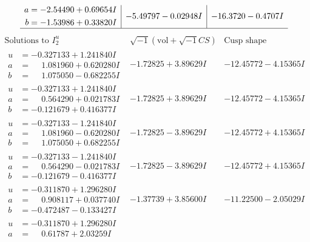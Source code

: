 \documentclass[1p]{elsarticle_modified}
\theoremstyle{definition}
\newcommand{\I}{\sqrt{-1}}
\begin{document}
$$\begin{array}{c|c|c}
\begin{aligned}
a &= -2.54490 + 0.69654 I \\
b &= -1.53986 + 0.33820 I\end{aligned}
 & -5.49797 - 0.02948 I & -16.3720 - 0.4707 I\\
 \hline 
 \end{array}$$\newpage$$\begin{array}{c|c|c}  
\text{Solutions to }I^u_{2}& \I (\text{vol} + \sqrt{-1}CS) & \text{Cusp shape}\\
 \hline 
\begin{aligned}
u &= -0.327133 + 1.241840 I \\
a &= \phantom{-}1.081960 + 0.620280 I \\
b &= \phantom{-}1.075050 - 0.682255 I\end{aligned}
 & -1.72825 + 3.89629 I & -12.45772 - 4.15365 I \\ \hline\begin{aligned}
u &= -0.327133 + 1.241840 I \\
a &= \phantom{-}0.564290 + 0.021783 I \\
b &= -0.121679 + 0.416377 I\end{aligned}
 & -1.72825 + 3.89629 I & -12.45772 - 4.15365 I \\ \hline\begin{aligned}
u &= -0.327133 - 1.241840 I \\
a &= \phantom{-}1.081960 - 0.620280 I \\
b &= \phantom{-}1.075050 + 0.682255 I\end{aligned}
 & -1.72825 - 3.89629 I & -12.45772 + 4.15365 I \\ \hline\begin{aligned}
u &= -0.327133 - 1.241840 I \\
a &= \phantom{-}0.564290 - 0.021783 I \\
b &= -0.121679 - 0.416377 I\end{aligned}
 & -1.72825 - 3.89629 I & -12.45772 + 4.15365 I \\ \hline\begin{aligned}
u &= -0.311870 + 1.296280 I \\
a &= \phantom{-}0.908117 + 0.037740 I \\
b &= -0.472487 - 0.133427 I\end{aligned}
 & -1.37739 + 3.85600 I & -11.22500 - 2.05029 I \\ \hline\begin{aligned}
u &= -0.311870 + 1.296280 I \\
a &= \phantom{-}0.61787 + 2.03259 I \\

\end{aligned}
\end{array}$$
\end{document}
